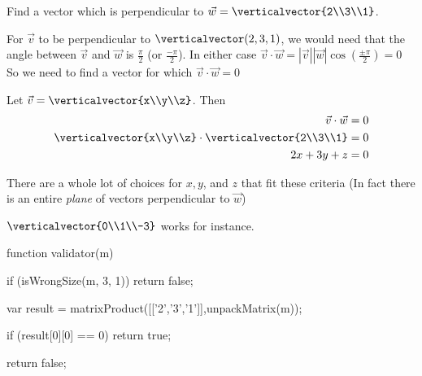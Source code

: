 \documentclass{ximera}
\begin{document}
\begin{question}
  Find a vector which is perpendicular to $\vec{w} = \verticalvector{2\\3\\1}$.  
  \begin{solution}
    \begin{hint}
      For $\vec{v}$ to be perpendicular to $\verticalvector(2,3,1)$, we would need that the angle between $\vec{v}$ and $\vec{w}$ is $\frac{\pi}{2}$ (or $\frac{-\pi}{2}$).
      In either case $\vec{v}\cdot\vec{w} = |\vec{v}||\vec{w}|\cos(\frac{\pm \pi}{2}) = 0$
      So we need to find a vector for which $\vec{v}\cdot \vec{w}=0$
    \end{hint}
    \begin{hint}
      Let $\vec{v} = \verticalvector{x\\y\\z}$.  Then 
      \begin{align*}
        \vec{v}\cdot\vec{w} &= 0\\
        \verticalvector{x\\y\\z}\cdot\verticalvector{2\\3\\1} &= 0\\
        2x+3y+z &= 0
      \end{align*}
    \end{hint}
    \begin{hint}
      There are a whole lot of choices for $x,y$, and $z$ that fit these criteria (In fact there is an entire \textit{plane} of vectors perpendicular to $\vec{w}$)
    \end{hint}
    \begin{hint}
      $\verticalvector{0\\1\\-3}$ works for instance.
    \end{hint}
    \begin{matrix-answer}
    function validator(m) {
      if (isWrongSize(m, 3, 1)) return false;

      var result = matrixProduct([['2','3','1']],unpackMatrix(m));

      if (result[0][0] == 0)
        return true;

      return false;
    }
    \end{matrix-answer}
  \end{solution}
\end{question}
\end{document}
